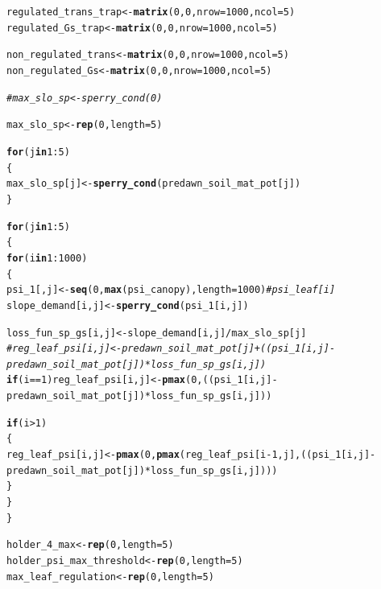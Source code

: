 \documentclass[a4paper]{article}\usepackage[]{graphicx}\usepackage[]{color}
\makeatletter
\newcommand{\hlnum}[1]{\textcolor[rgb]{0.686,0.059,0.569}{#1}}%
\newcommand{\hlcom}[1]{\textcolor[rgb]{0.678,0.584,0.686}{\textit{#1}}}%
\newcommand{\hlopt}[1]{\textcolor[rgb]{0,0,0}{#1}}%
\newcommand{\hlstd}[1]{\textcolor[rgb]{0.345,0.345,0.345}{#1}}%
\newcommand{\hlkwa}[1]{\textcolor[rgb]{0.161,0.373,0.58}{\textbf{#1}}}%
\newcommand{\hlkwb}[1]{\textcolor[rgb]{0.69,0.353,0.396}{#1}}%
\newcommand{\hlkwc}[1]{\textcolor[rgb]{0.333,0.667,0.333}{#1}}%
\newcommand{\hlkwd}[1]{\textcolor[rgb]{0.737,0.353,0.396}{\textbf{#1}}}%
\newenvironment{kframe}{%
 \def\at@end@of@kframe{}%
 \ifinner\ifhmode%
  \def\at@end@of@kframe{\end{minipage}}%
  \begin{minipage}{\columnwidth}%
 \fi\fi%
 \def\FrameCommand##1{\hskip\@totalleftmargin \hskip-\fboxsep
 \colorbox{shadecolor}{##1}\hskip-\fboxsep
     \hskip-\linewidth \hskip-\@totalleftmargin \hskip\columnwidth}%
 \MakeFramed {\advance\hsize-\width
   \@totalleftmargin\z@ \linewidth\hsize
   \@setminipage}}%
 {\par\unskip\endMakeFramed%
 \at@end@of@kframe}
\newenvironment{knitrout}{}{} %
\makeatother
\begin{document}
\begin{knitrout}
\begin{kframe}
\begin{alltt}
\hlstd{regulated_trans_trap} \hlkwb{<-} \hlkwd{matrix}\hlstd{(}\hlnum{0}\hlstd{,}\hlnum{0}\hlstd{,}\hlkwc{nrow}\hlstd{=}\hlnum{1000}\hlstd{,} \hlkwc{ncol}\hlstd{=}\hlnum{5}\hlstd{)}
\hlstd{regulated_Gs_trap} \hlkwb{<-} \hlkwd{matrix}\hlstd{(}\hlnum{0}\hlstd{,}\hlnum{0}\hlstd{,}\hlkwc{nrow}\hlstd{=}\hlnum{1000}\hlstd{,} \hlkwc{ncol}\hlstd{=}\hlnum{5}\hlstd{)}

\hlstd{non_regulated_trans} \hlkwb{<-} \hlkwd{matrix}\hlstd{(}\hlnum{0}\hlstd{,}\hlnum{0}\hlstd{,}\hlkwc{nrow}\hlstd{=}\hlnum{1000}\hlstd{,} \hlkwc{ncol}\hlstd{=}\hlnum{5}\hlstd{)}
\hlstd{non_regulated_Gs} \hlkwb{<-} \hlkwd{matrix}\hlstd{(}\hlnum{0}\hlstd{,}\hlnum{0}\hlstd{,}\hlkwc{nrow}\hlstd{=}\hlnum{1000}\hlstd{,} \hlkwc{ncol}\hlstd{=}\hlnum{5}\hlstd{)}

\hlcom{#max_slo_sp <- sperry_cond(0) }

\hlstd{max_slo_sp} \hlkwb{<-} \hlkwd{rep}\hlstd{(}\hlnum{0}\hlstd{,} \hlkwc{length}\hlstd{=}\hlnum{5}\hlstd{)}

\hlkwa{for}\hlstd{(j} \hlkwa{in} \hlnum{1}\hlopt{:}\hlnum{5}\hlstd{)}
\hlstd{\{}
  \hlstd{max_slo_sp[j]} \hlkwb{<-} \hlkwd{sperry_cond}\hlstd{(predawn_soil_mat_pot[j])}
\hlstd{\}}

\hlkwa{for}\hlstd{(j} \hlkwa{in} \hlnum{1}\hlopt{:}\hlnum{5}\hlstd{)}
\hlstd{\{}
  \hlkwa{for}\hlstd{(i} \hlkwa{in} \hlnum{1}\hlopt{:}\hlnum{1000}\hlstd{)}
  \hlstd{\{}
   \hlstd{psi_1[,j]} \hlkwb{<-} \hlkwd{seq}\hlstd{(}\hlnum{0}\hlstd{,} \hlkwd{max}\hlstd{(psi_canopy),} \hlkwc{length}\hlstd{=}\hlnum{1000}\hlstd{)} \hlcom{#psi_leaf[i]}
   \hlstd{slope_demand[i,j]} \hlkwb{<-} \hlkwd{sperry_cond}\hlstd{(psi_1[i,j])}

   \hlstd{loss_fun_sp_gs[i,j]} \hlkwb{<-} \hlstd{slope_demand[i,j]} \hlopt{/} \hlstd{max_slo_sp[j]}
   \hlcom{#reg_leaf_psi[i,j] <- predawn_soil_mat_pot[j] + ((psi_1[i,j] - predawn_soil_mat_pot[j])*loss_fun_sp_gs[i,j])}
   \hlkwa{if}\hlstd{(i}\hlopt{==}\hlnum{1}\hlstd{) reg_leaf_psi[i,j]} \hlkwb{<-} \hlkwd{pmax}\hlstd{(}\hlnum{0}\hlstd{, ((psi_1[i,j]} \hlopt{-} \hlstd{predawn_soil_mat_pot[j])}\hlopt{*}\hlstd{loss_fun_sp_gs[i,j]))}

   \hlkwa{if}\hlstd{(i}\hlopt{>}\hlnum{1}\hlstd{)}
   \hlstd{\{}
     \hlstd{reg_leaf_psi[i,j]} \hlkwb{<-} \hlkwd{pmax}\hlstd{(}\hlnum{0}\hlstd{,} \hlkwd{pmax}\hlstd{(reg_leaf_psi[i}\hlopt{-}\hlnum{1}\hlstd{,j], ((psi_1[i,j]} \hlopt{-} \hlstd{predawn_soil_mat_pot[j])}\hlopt{*}\hlstd{loss_fun_sp_gs[i,j])))}
   \hlstd{\}}
  \hlstd{\}}
\hlstd{\}}

\hlstd{holder_4_max} \hlkwb{<-} \hlkwd{rep}\hlstd{(}\hlnum{0}\hlstd{,} \hlkwc{length}\hlstd{=}\hlnum{5}\hlstd{)}
\hlstd{holder_psi_max_threshold} \hlkwb{<-} \hlkwd{rep}\hlstd{(}\hlnum{0}\hlstd{,} \hlkwc{length}\hlstd{=}\hlnum{5}\hlstd{)}
\hlstd{max_leaf_regulation} \hlkwb{<-} \hlkwd{rep}\hlstd{(}\hlnum{0}\hlstd{,} \hlkwc{length}\hlstd{=}\hlnum{5}\hlstd{)}


\end{alltt}
\end{kframe}
\end{knitrout}
\end{document}
